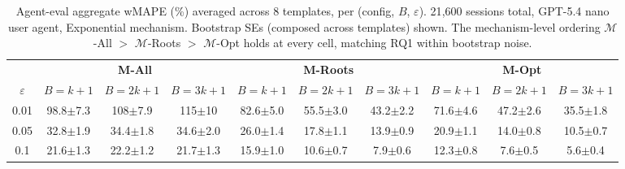 \providecommand{\pmstd}[1]{{\scriptsize $\pm$#1}}

\begin{table}[t]
\centering
\small
\caption{Agent-eval aggregate wMAPE (\%) averaged across 8 templates, per (config, $B$, $\varepsilon$). 21{,}600 sessions total, GPT-5.4 nano user agent, Exponential mechanism. Bootstrap SEs (composed across templates) shown. The mechanism-level ordering $\mathcal{M}$-All $>$ $\mathcal{M}$-Roots $>$ $\mathcal{M}$-Opt holds at every cell, matching RQ1 within bootstrap noise.}
\label{tab:agent_aggregate_wmape}
\begin{tabular}{c|ccc|ccc|ccc}
\toprule
& \multicolumn{3}{c|}{\textbf{M-All}} & \multicolumn{3}{c|}{\textbf{M-Roots}} & \multicolumn{3}{c}{\textbf{M-Opt}} \\
$\varepsilon$ & $B=k+1$ & $B=2k+1$ & $B=3k+1$ & $B=k+1$ & $B=2k+1$ & $B=3k+1$ & $B=k+1$ & $B=2k+1$ & $B=3k+1$ \\
\midrule
0.01 & 98.8\pmstd{7.3} & 108\pmstd{7.9} & 115\pmstd{10} & 82.6\pmstd{5.0} & 55.5\pmstd{3.0} & 43.2\pmstd{2.2} & 71.6\pmstd{4.6} & 47.2\pmstd{2.6} & 35.5\pmstd{1.8} \\
0.05 & 32.8\pmstd{1.9} & 34.4\pmstd{1.8} & 34.6\pmstd{2.0} & 26.0\pmstd{1.4} & 17.8\pmstd{1.1} & 13.9\pmstd{0.9} & 20.9\pmstd{1.1} & 14.0\pmstd{0.8} & 10.5\pmstd{0.7} \\
0.1 & 21.6\pmstd{1.3} & 22.2\pmstd{1.2} & 21.7\pmstd{1.3} & 15.9\pmstd{1.0} & 10.6\pmstd{0.7} & 7.9\pmstd{0.6} & 12.3\pmstd{0.8} & 7.6\pmstd{0.5} & 5.6\pmstd{0.4} \\
\bottomrule
\end{tabular}
\end{table}